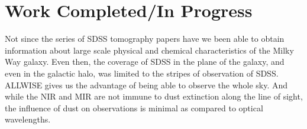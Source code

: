 %

\section{Work Completed/In Progress}
Not since the series of SDSS tomography papers have we been able to obtain information about large scale physical and chemical characteristics of the Milky Way galaxy. Even then, the coverage of SDSS in the plane of the galaxy, and even in the galactic halo, was limited to the stripes of observation of SDSS. ALLWISE gives us the advantage of being able to observe the whole sky. And while the NIR and MIR are not immune to dust extinction along the line of sight, the influence of dust on observations is minimal as compared to optical wavelengths. 

